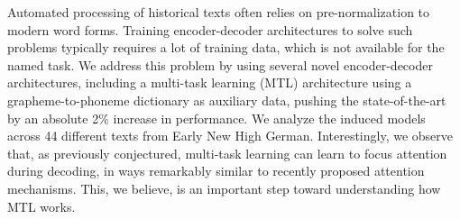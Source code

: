Automated processing of historical texts often relies on pre-normalization to modern word forms. Training encoder-decoder architectures to solve such problems typically requires a lot of training data, which is not available for the named task. We address this problem by using several novel encoder-decoder architectures, including a multi-task learning (MTL) architecture using a grapheme-to-phoneme dictionary as auxiliary data, pushing the state-of-the-art by an absolute 2\% increase in performance. We analyze the induced models across 44 different texts from Early New High German. Interestingly, we observe that, as previously conjectured, multi-task learning can learn to focus attention during decoding, in ways remarkably similar to recently proposed attention mechanisms. This, we believe, is an important step toward understanding how MTL works.
